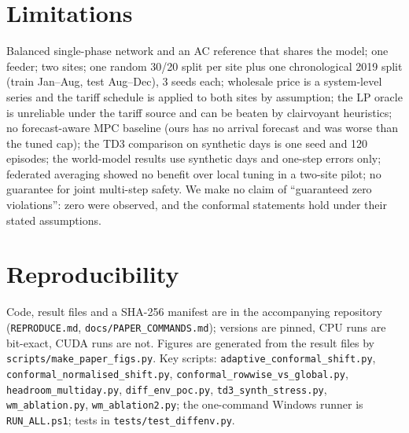 \documentclass[10pt]{article}
\begin{document}
\section{Limitations}
Balanced single-phase network and an AC reference that shares the model; one feeder; two sites; one random 30/20 split per site plus one chronological 2019 split (train Jan--Aug, test Aug--Dec), 3 seeds each; wholesale price is a system-level series and the tariff schedule is applied to both sites by assumption; the LP oracle is unreliable under the tariff source and can be beaten by clairvoyant heuristics; no forecast-aware MPC baseline (ours has no arrival forecast and was worse than the tuned cap); the TD3 comparison on synthetic days is one seed and 120 episodes; the world-model results use synthetic days and one-step errors only; federated averaging showed no benefit over local tuning in a two-site pilot; no guarantee for joint multi-step safety. We make no claim of ``guaranteed zero violations'': zero were observed, and the conformal statements hold under their stated assumptions.

\section{Reproducibility}
\sloppy Code, result files and a SHA-256 manifest are in the accompanying repository (\texttt{REPRODUCE.md}, \texttt{docs/PAPER\_COMMANDS.md}); versions are pinned, CPU runs are bit-exact, CUDA runs are not. Figures are generated from the result files by \texttt{scripts/make\_paper\_figs.py}. Key scripts: \texttt{adaptive\_conformal\_shift.py}, \texttt{conformal\_normalised\_shift.py}, \texttt{conformal\_rowwise\_vs\_global.py}, \texttt{headroom\_multiday.py}, \texttt{diff\_env\_poc.py}, \texttt{td3\_synth\_stress.py}, \texttt{wm\_ablation.py}, \texttt{wm\_ablation2.py}; the one-command Windows runner is \texttt{RUN\_ALL.ps1}; tests in \texttt{tests/test\_diffenv.py}.
\end{document}
